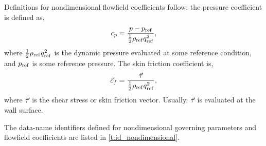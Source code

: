Definitions for nondimensional flowfield coefficients follow: the
pressure coefficient is defined as,
$$
 c_p = {p - p_{\rm ref} \over {1\over2} \rho_{\rm ref} q_{\rm ref}^2},
$$
where ${1\over2} \rho_{\rm ref} q_{\rm ref}^2$ is the dynamic pressure evaluated at
some reference condition, and $p_{\rm ref}$ is some reference pressure.  The 
skin friction coefficient is,
$$
 {\vec{c}}_f = {{\vec{\tau}} \over {1\over2} \rho_{\rm ref} q_{\rm ref}^2},
$$
where ${\vec{\tau}}$ is the shear stress or skin friction vector.  Usually, 
${\vec{\tau}}$ is evaluated at the wall surface.

The data-name identifiers defined for nondimensional governing
parameters and flowfield coefficients are listed in
\autoref{t:id_nondimensional}.

\settowidth{\tmplengthb}{$\M \L/(\T^3 \TH)$}
\setlength{\LTleft}{0pt}
\setlength{\LTright}{0pt}
\setlength{\Pwidth}{\linewidth-6\tabcolsep-\tmplengtha-\tmplengthb}
